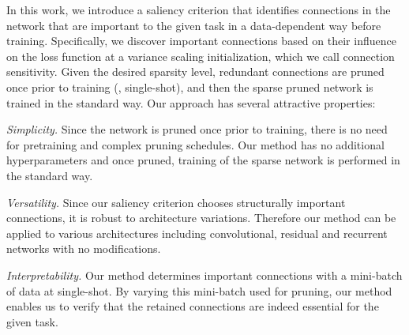 In this work, we introduce a saliency criterion that identifies connections in the network that are important to the given task in a data-dependent way before training.
Specifically, we discover important connections based on their influence on the loss function at a variance scaling initialization, which we call connection sensitivity.
Given the desired sparsity level, redundant connections are pruned once prior to training (\ie, single-shot), and then the sparse pruned network is trained in the standard way.
Our approach has several attractive properties:
\begin{tight_itemize}
\vspace{-2mm}
\item \emph{Simplicity.}\;
    Since the network is pruned once prior to training, there is no need for pretraining and complex pruning schedules.
    Our method has no additional hyperparameters and once pruned, training of the sparse network is performed in the standard way.
\item \emph{Versatility.}\;
	Since our saliency criterion chooses structurally important connections, it is robust to architecture variations.
	Therefore our method can be applied to various architectures including convolutional, residual and recurrent networks with no modifications. 
\item \emph{Interpretability.}\;
    Our method determines important connections with a mini-batch of data at single-shot. 
    By varying this mini-batch used for pruning, our method enables us to verify that the retained connections are indeed essential for the given task.   
\end{tight_itemize}

